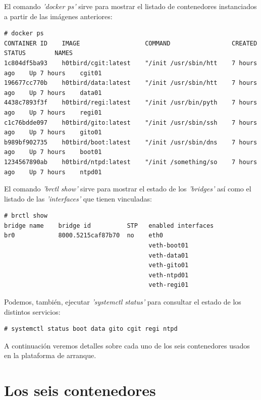 \documentclass[a4paper,12pt,spanish,final]{epsc_tfc_pfc}
\begin{document}
El comando \emph{'docker ps'} sirve para mostrar el listado de contenedores instanciados a partir de las imágenes anteriores:\\

\begin{lstlisting}[style=dnsmasq]
# docker ps
CONTAINER ID    IMAGE                  COMMAND                 CREATED        STATUS        NAMES
1c804df5ba93    h0tbird/cgit:latest    "/init /usr/sbin/htt    7 hours ago    Up 7 hours    cgit01
196677cc770b    h0tbird/data:latest    "/init /usr/sbin/htt    7 hours ago    Up 7 hours    data01
4438c7893f3f    h0tbird/regi:latest    "/init /usr/bin/pyth    7 hours ago    Up 7 hours    regi01
c1c76bdde097    h0tbird/gito:latest    "/init /usr/sbin/ssh    7 hours ago    Up 7 hours    gito01
b989bf902735    h0tbird/boot:latest    "/init /usr/sbin/dns    7 hours ago    Up 7 hours    boot01
1234567890ab    h0tbird/ntpd:latest    "/init /something/so    7 hours ago    Up 7 hours    ntpd01
\end{lstlisting}

El comando \emph{'brctl show'} sirve para mostrar el estado de los \emph{'bridges'} así como el listado de las \emph{'interfaces'} que tienen vinculadas:\\

\begin{lstlisting}[style=dnsmasq]
# brctl show
bridge name    bridge id          STP   enabled interfaces
br0            8000.5215caf87b70  no    eth0
                                        veth-boot01
                                        veth-data01
                                        veth-gito01
                                        veth-ntpd01
                                        veth-regi01
\end{lstlisting}

Podemos, también, ejecutar \emph{'systemctl status'} para consultar el estado de los distintos servicios:\\

\begin{lstlisting}[style=dnsmasq]
# systemctl status boot data gito cgit regi ntpd
\end{lstlisting}

A continuación veremos detalles sobre cada uno de los seis contenedores usados en la plataforma de arranque.

\clearpage

\section{Los seis contenedores}
\end{document}
